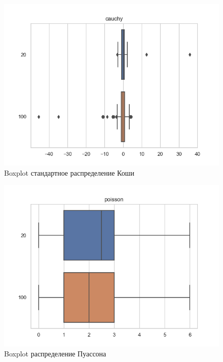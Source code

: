 \documentclass[a4]{article}
\begin{document}
\begin{center}
\begin{figure}[H]
\caption{Boxplot стандартное распределение Коши }
\includegraphics[width=\textwidth]{cauchy.png} 
\end{figure}

\begin{figure}[H]
\caption{Boxplot распределение Пуассона }
\includegraphics[width=\textwidth]{poisson.png} 
\end{figure}


\end{center}
\end{document}
